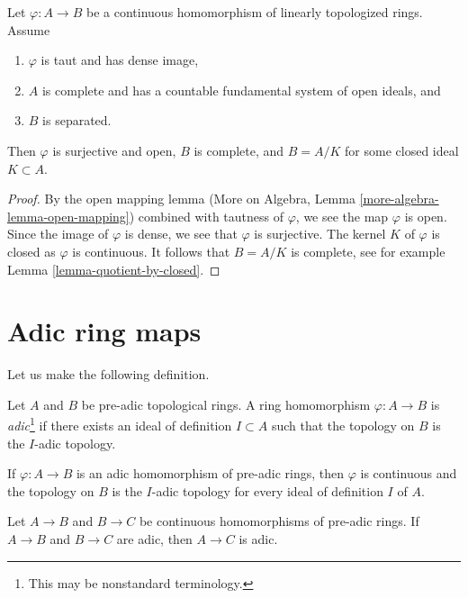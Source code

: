 \begin{lemma}
\label{lemma-dense-image-surjective}
Let $\varphi : A \to B$ be a continuous homomorphism of
linearly topologized rings. Assume
\begin{enumerate}
\item $\varphi$ is taut and has dense image,
\item $A$ is complete and has a countable fundamental system of
open ideals, and
\item $B$ is separated.
\end{enumerate}
Then $\varphi$ is surjective and open, $B$ is complete, and $B = A/K$ for
some closed ideal $K \subset A$.
\end{lemma}

\begin{proof}
By the open mapping lemma (More on Algebra, Lemma
\ref{more-algebra-lemma-open-mapping})
combined with tautness of $\varphi$, 
we see the map $\varphi$ is open. Since the image of $\varphi$
is dense, we see that $\varphi$ is surjective. The kernel $K$
of $\varphi$ is closed as $\varphi$ is continuous.
It follows that $B = A/K$ is complete, see for example
Lemma \ref{lemma-quotient-by-closed}.
\end{proof}







\section{Adic ring maps}
\label{section-adic-ring-maps}

\noindent
Let us make the following definition.

\begin{definition}
\label{definition-adic-homomorphism}
Let $A$ and $B$ be pre-adic topological rings. A ring homomorphism
$\varphi : A \to B$ is {\it adic}\footnote{This may be nonstandard terminology.}
if there exists an ideal of definition $I \subset A$ such that
the topology on $B$ is the $I$-adic topology.
\end{definition}

\noindent
If $\varphi : A \to B$ is an adic homomorphism of pre-adic rings, then
$\varphi$ is continuous and the topology on $B$ is the $I$-adic topology
for every ideal of definition $I$ of $A$.

\begin{lemma}
\label{lemma-composition-adic}
Let $A \to B$ and $B \to C$ be continuous homomorphisms of
pre-adic rings. If $A \to B$ and $B \to C$ are adic, then
$A \to C$ is adic.
\end{lemma}

